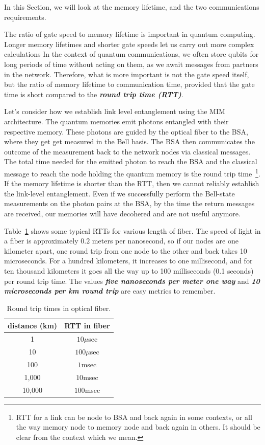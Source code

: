 In this Section, we will look at the memory lifetime, and the two communications requirements.

The ratio of gate speed to memory lifetime is important in quantum computing.
Longer memory lifetimes and shorter gate speeds let us carry out more complex calculations
In the context of quantum communications, we often store qubits for long periods of time without acting on them, as we await messages from partners in the network.
Therefore, what is more important is not the gate speed itself, but the ratio of memory lifetime to communication time, 
provided that the gate time is short compared to the \textbf{\emph{round trip time (RTT)}}. 

Let's consider how we establish link level entanglement using the MIM architecture.
The quantum memories emit photons entangled with their respective memory.
These photons are guided by the optical fiber to the BSA, where they get get measured in the Bell basis.
The BSA then communicates the outcome of the measurement back to the  network nodes via classical messages.
The total time needed for the emitted photon to reach the BSA and the classical message to reach the node holding the quantum memory is the round trip time~\footnote{RTT for a link can be node to BSA and back again in some contexts, or all the way memory node to memory node and back again in others. It should be clear from the context which we mean.}.
If the memory lifetime is shorter than the RTT, then we cannot reliably establish the link-level entanglement.
Even if we successfully perform the Bell-state measurements on the photon pairs at the BSA, by the time the return messages are received, our memories will have decohered and are not useful anymore.

Table~\ref{tab:rtt} shows some typical RTTs for various length of fiber.
The speed of light in a fiber is approximately $0.2$ meters per nanosecond, so if our nodes are one kilometer apart, one round trip from one node to the other and back takes 10 microseconds. For a hundred kilometers, it increases to one millisecond, and for ten thousand kilometers it goes all the way up to 100 milliseconds (0.1 seconds) per round trip time.
The values \textbf{\emph{five nanoseconds per meter one way}} and \textbf{\emph{10 microseconds per km round trip}} are easy metrics to remember.

\begin{table}
    \setcellgapes{3pt}
    \renewcommand\theadfont{}
    \makegapedcells
    \centering
    \begin{tabular}{cc}
    \hline
    \textbf{distance (km)}  & \textbf{RTT in fiber} \\
    \hline
    1     & $10\mu$sec \\
    10    & $100\mu$sec \\
    100   & $1$msec \\
    1,000 & $10$msec \\
    10,000 & $100$msec \\
    \hline
    \end{tabular}
    \caption{Round trip times in optical fiber.}
    \label{tab:rtt}
\end{table}

